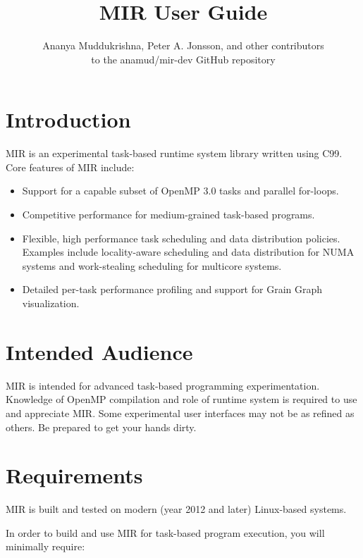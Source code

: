 \documentclass[11pt,a4paper]{article}
\title{MIR User Guide}
\author{Ananya Muddukrishna, Peter A. Jonsson, and other contributors \\ to the \textsf{anamud/mir-dev} GitHub repository}
\begin{document}
\maketitle
\tableofcontents

\section{Introduction}\label{sec:introduction}

MIR is an experimental task-based runtime system library written using C99. Core features of MIR include:

\begin{itemize}
    \item Support for a capable subset of OpenMP 3.0 tasks and parallel for-loops.
    \item Competitive performance for medium-grained task-based programs.
    \item Flexible, high performance task scheduling and data distribution policies. Examples include locality-aware scheduling and data distribution for NUMA systems and work-stealing scheduling for multicore systems.
    \item Detailed per-task performance profiling and support for Grain Graph~\cite{muddukrishna2015grain} visualization.
\end{itemize}

\section{Intended Audience}\label{sec:intended-audience}

MIR is intended for advanced task-based programming experimentation. Knowledge of OpenMP compilation and role of runtime system is required to use and appreciate MIR. Some experimental user interfaces may not be as refined as others. Be prepared to get your hands dirty.

\section{Requirements}\label{sec:installation}

MIR is built and tested on modern (year 2012 and later) Linux-based systems.

In order to build and use MIR for task-based program execution, you will minimally require:
\end{document}

